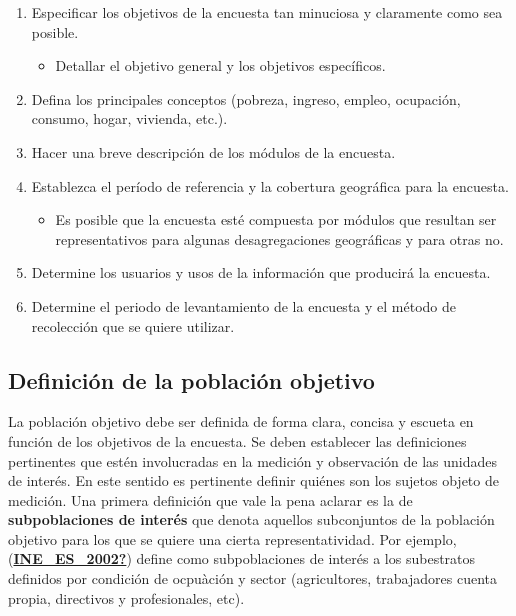 \documentclass[
  12pt,
  spanish,
]{book}
\providecommand{\tightlist}{%
  \setlength{\itemsep}{0pt}\setlength{\parskip}{0pt}}
\begin{document}
\begin{enumerate}
\def\labelenumi{\arabic{enumi}.}
\tightlist
\item
  Especificar los objetivos de la encuesta tan minuciosa y claramente como sea posible.

  \begin{itemize}
  \tightlist
  \item
    Detallar el objetivo general y los objetivos específicos.
  \end{itemize}
\item
  Defina los principales conceptos (pobreza, ingreso, empleo, ocupación, consumo, hogar, vivienda, etc.).
\item
  Hacer una breve descripción de los módulos de la encuesta.
\item
  Establezca el período de referencia y la cobertura geográfica para la encuesta.

  \begin{itemize}
  \tightlist
  \item
    Es posible que la encuesta esté compuesta por módulos que resultan ser representativos para algunas desagregaciones geográficas y para otras no.
  \end{itemize}
\item
  Determine los usuarios y usos de la información que producirá la encuesta.
\item
  Determine el periodo de levantamiento de la encuesta y el método de recolección que se quiere utilizar.
\end{enumerate}

\hypertarget{definiciuxf3n-de-la-poblaciuxf3n-objetivo}{%
\subsection*{Definición de la población objetivo}\label{definiciuxf3n-de-la-poblaciuxf3n-objetivo}}

La población objetivo debe ser definida de forma clara, concisa y escueta en función de los objetivos de la encuesta. Se deben establecer las definiciones pertinentes que estén involucradas en la medición y observación de las unidades de interés. En este sentido es pertinente definir quiénes son los sujetos objeto de medición. Una primera definición que vale la pena aclarar es la de \textbf{subpoblaciones de interés} que denota aquellos subconjuntos de la población objetivo para los que se quiere una cierta representatividad. Por ejemplo, (\protect\hyperlink{ref-INE_ES_2002}{\textbf{INE\_ES\_2002?}}) define como subpoblaciones de interés a los subestratos definidos por condición de ocpuàción y sector (agricultores, trabajadores cuenta propia, directivos y profesionales, etc).
\end{document}
